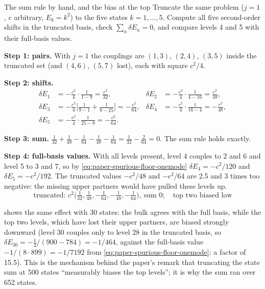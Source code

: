 \begin{sample}{The sum rule by hand, and the bias at the top}
Truncate the same problem ($j=1$, $c$ arbitrary, $E_k=k^2$) to the five states $k=1,\dots,5$. Compute all five second-order shifts in the truncated basis, check $\sum_n\delta E_n=0$, and compare levels 4 and 5 with their full-basis values.

\textbf{Step 1: pairs.} With $j=1$ the couplings are $(1,3)$, $(2,4)$, $(3,5)$ inside the truncated set (and $(4,6)$, $(5,7)$ lost), each with square $c^2/4$.

\textbf{Step 2: shifts.}
\begin{align*}
\delta E_1&=-\tfrac{c^2}{4}\cdot\tfrac{1}{1-9}=\tfrac{c^2}{32},&
\delta E_2&=-\tfrac{c^2}{4}\cdot\tfrac{1}{4-16}=\tfrac{c^2}{48},\\
\delta E_3&=-\tfrac{c^2}{4}\Big[\tfrac{1}{9-1}+\tfrac{1}{9-25}\Big]=-\tfrac{c^2}{64},&
\delta E_4&=-\tfrac{c^2}{4}\cdot\tfrac{1}{16-4}=-\tfrac{c^2}{48},\\
\delta E_5&=-\tfrac{c^2}{4}\cdot\tfrac{1}{25-9}=-\tfrac{c^2}{64}.
\end{align*}

\textbf{Step 3: sum.} $\tfrac{1}{32}+\tfrac{1}{48}-\tfrac{1}{64}-\tfrac{1}{48}-\tfrac{1}{64}=\tfrac{1}{32}-\tfrac{2}{64}=0$. The sum rule holds exactly.

\textbf{Step 4: full-basis values.} With all levels present, level 4 couples to 2 and 6 and level 5 to 3 and 7, so by \cref{eq:paper-spurious-floor-onemode} $\delta E_4=-c^2/120$ and $\delta E_5=-c^2/192$. The truncated values $-c^2/48$ and $-c^2/64$ are 2.5 and 3 times too negative: the missing upper partners would have pulled these levels up.
\[
\boxed{\text{truncated: }c^2\big(\tfrac1{32},\tfrac1{48},-\tfrac1{64},-\tfrac1{48},-\tfrac1{64}\big),\ \text{sum }0;\quad\text{top two biased low}}
\]
\end{sample}

 shows the same effect with 30 states: the bulk agrees with the full basis, while the top two levels, which have lost their upper partners, are biased strongly downward (level 30 couples only to level 28 in the truncated basis, so $\delta E_{30}=-\tfrac14/(900-784)=-1/464$, against the full-basis value $-1/(8\cdot899)=-1/7192$ from \cref{eq:paper-spurious-floor-onemode}: a factor of 15.5). This is the mechanism behind the paper's remark that truncating the state sum at 500 states ``measurably biases the top levels''; it is why the sum ran over 652 states.

